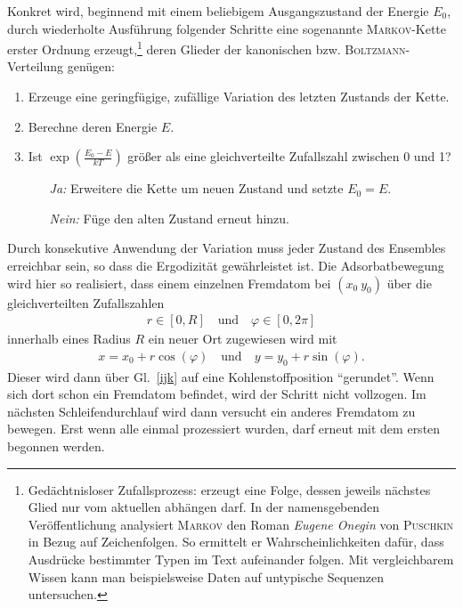 \documentclass[a4paper, 10pt, twoside, openany]{book} %
\newcommand \parens[1]{\left ( #1 \right )}
\def \phi {\varphi}
\begin{document}
	Konkret wird, beginnend mit einem beliebigem Ausgangszustand der Energie $E_0$, durch wiederholte Ausführung folgender Schritte eine sogenannte \textsc{Markov}-Kette erster Ordnung erzeugt,\footnote{Gedächtnisloser Zufallsprozess: erzeugt eine Folge, dessen jeweils nächstes Glied nur vom aktuellen abhängen darf. In der namensgebenden Veröffentlichung \cite{Markov} analysiert \textsc{Markov} den Roman \emph{Eugene Onegin} von \textsc{Puschkin} in Bezug auf Zeichenfolgen. So  ermittelt er Wahrscheinlichkeiten dafür, dass Ausdrücke bestimmter Typen im Text aufeinander folgen. Mit vergleichbarem Wissen kann man beispielsweise Daten auf untypische Sequenzen untersuchen.} deren Glieder der kanonischen bzw. \textsc{Boltzmann}-Verteilung genügen:
	\begin{enumerate}
		\item Erzeuge eine geringfügige, zufällige Variation des letzten Zustands der Kette.
		\item Berechne deren Energie $E$.
		\item Ist $\exp \parens{\frac{E_0 - E}{k T}}$ größer als eine gleichverteilte Zufallszahl zwischen 0 und 1?
		\begin{itemize}
			\item[\emph{Ja:}] Erweitere die Kette um neuen Zustand und setzte $E_0 = E$.
			\item[\emph{Nein:}] Füge den alten Zustand erneut hinzu.
		\end{itemize}
	\end{enumerate}
	Durch konsekutive Anwendung der Variation muss jeder Zustand des Ensembles erreichbar sein, so dass die Ergodizität gewährleistet ist. Die Adsorbatbewegung wird hier so realisiert, dass einem einzelnen Fremdatom bei $(x_0 \ y_0)$ über die gleichverteilten Zufallszahlen
	\begin{align*}
		r \in [0, R] \quad \text{und} \quad \phi \in [0, 2 \pi]
	\end{align*}
	innerhalb eines Radius $R$ ein neuer Ort zugewiesen wird mit
	\begin{align*}
		x = x_0 + r \cos(\phi) \quad \text{und} \quad y = y_0 + r \sin(\phi).
	\end{align*}
	Dieser wird dann über Gl.~\ref{ijk} auf eine Kohlenstoffposition "`gerundet"'. Wenn sich dort schon ein Fremdatom befindet, wird der Schritt nicht vollzogen. Im nächsten Schleifendurchlauf wird dann versucht ein anderes Fremdatom zu bewegen. Erst wenn alle einmal prozessiert wurden, darf erneut mit dem ersten begonnen werden.
	
\end{document}
